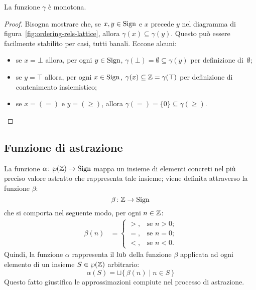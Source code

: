 \begin{proposizione}
La funzione $\gamma$ è monotona.
\end{proposizione}
\begin{proof}
  Bisogna mostrare che, se $x, y \in \mathrm{Sign}$ e $x$ precede $y$ nel diagramma
  di figura~\ref{fig:ordering-rels-lattice}, allora
  $\gamma(x) \subseteq \gamma(y)$.
  Questo può essere facilmente stabilito per casi, tutti banali.
  Eccone alcuni:
  \begin{itemize}
    \item
      se $x = \bot$ allora, per ogni $y \in \mathrm{Sign}$,
      $\gamma(\bot) = \emptyset \subseteq \gamma(y)$
      per definizione di~$\emptyset$;
    \item
      se $y = \top$ allora, per ogni $x \in \mathrm{Sign}$,
      $\gamma(x) \subseteq \mathbb{Z} = \gamma(\top)$
      per definizione di contenimento insiemistico;
    \item
      se $x = (=)$ e $y = (\geq)$, allora
      $\gamma(=) = \{0\} \subseteq \gamma(\geq)$.
  \end{itemize}
\end{proof}

\subsection{Funzione di astrazione}

\begin{definizione} 
La funzione $\mathord{\alpha}\colon\wp(\mathbb{Z})\to\mathrm{Sign}$ mappa un insieme
di elementi concreti nel più preciso valore astratto che rappresenta
tale insieme; viene definita attraverso la funzione $\beta$:
\[
  \mathord{\beta}\colon\mathbb{Z}\to\mathrm{Sign}
\]
che si comporta nel seguente modo, per ogni $n \in \mathbb{Z}$:
\begin{align*}
  \beta(n) &=
    \begin{cases}
      >,      &\text{se $n  >  0$;} \\
      =,      &\text{se $n = 0$;} \\
      <,      &\text{se $n < 0$.}
    \end{cases} 
\end{align*}
Quindi, la funzione $\alpha$ rappresenta il $\mathop{\mathrm{lub}}\nolimits$ della
funzione $\beta$ applicata ad ogni elemento di un insieme
$S \in \wp(\mathbb{Z})$ arbitrario:
\[
  \alpha(S) = \sqcup \{\, \beta(n) \mid n \in S \,\}
\]
Questo fatto giustifica le approssimazioni compiute nel processo
di astrazione.
\end{definizione}

